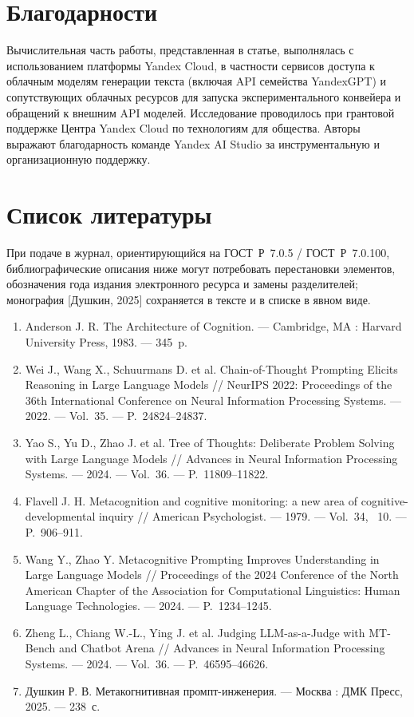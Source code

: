 \documentclass[a4paper,12pt]{article}
\begin{document}
\section*{Благодарности}

Вычислительная часть работы, представленная в статье, выполнялась с использованием платформы Yandex Cloud, в частности сервисов доступа к облачным моделям генерации текста (включая API семейства YandexGPT) и сопутствующих облачных ресурсов для запуска экспериментального конвейера и обращений к внешним API моделей. Исследование проводилось при грантовой поддержке Центра Yandex Cloud по технологиям для общества. Авторы выражают благодарность команде Yandex AI Studio за инструментальную и организационную поддержку.

\section*{Список литературы}

\noindent\small При подаче в журнал, ориентирующийся на ГОСТ~Р~7.0.5 / ГОСТ~Р~7.0.100, библиографические описания ниже могут потребовать перестановки элементов, обозначения года издания электронного ресурса и замены разделителей; монография [Душкин, 2025] сохраняется в тексте и в списке в явном виде.

\begin{enumerate}
  \item Anderson J. R. The Architecture of Cognition. --- Cambridge, MA : Harvard University Press, 1983. --- 345~p.
  \item Wei J., Wang X., Schuurmans D. et al. Chain-of-Thought Prompting Elicits Reasoning in Large Language Models // NeurIPS 2022: Proceedings of the 36th International Conference on Neural Information Processing Systems. --- 2022. --- Vol.~35. --- P.~24824--24837.
  \item Yao S., Yu D., Zhao J. et al. Tree of Thoughts: Deliberate Problem Solving with Large Language Models // Advances in Neural Information Processing Systems. --- 2024. --- Vol.~36. --- P.~11809--11822.
  \item Flavell J. H. Metacognition and cognitive monitoring: a new area of cognitive-developmental inquiry // American Psychologist. --- 1979. --- Vol.~34, \textnumero~10. --- P.~906--911.
  \item Wang Y., Zhao Y. Metacognitive Prompting Improves Understanding in Large Language Models // Proceedings of the 2024 Conference of the North American Chapter of the Association for Computational Linguistics: Human Language Technologies. --- 2024. --- P.~1234--1245.
  \item Zheng L., Chiang W.-L., Ying J. et al. Judging LLM-as-a-Judge with MT-Bench and Chatbot Arena // Advances in Neural Information Processing Systems. --- 2024. --- Vol.~36. --- P.~46595--46626.
  \item Душкин Р. В. Метакогнитивная промпт-инженерия. --- Москва : ДМК Пресс, 2025. --- 238~с.
\end{enumerate}
\end{document}
